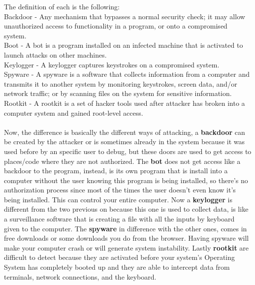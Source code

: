 \documentclass[12pt]{article}
\begin{document}
\begin{enumerate}
	The definition of each is the following: \\
	Backdoor - Any mechanism that bypasses a normal security check; it may allow unauthorized access to functionality in a program, or onto a compromised system. \\
	Boot - A bot is a program installed on an infected machine that is activated to launch attacks on other machines.\\ 
	Keylogger - A keylogger captures keystrokes on a compromised system.\\
	Spyware - A spyware is a software that collects information from a computer and transmits it to another system by monitoring keystrokes, screen data, and/or network traffic; or by scanning files on the system for sensitive information.\\
	Rootkit - A rootkit is a set of hacker tools used after attacker has broken into a computer system and gained root-level access.\\ \\ Now, the difference is basically the different ways of attacking, a \textbf{backdoor} can be created by the attacker or is sometimes already in the system because it was used before by an specific user to debug, but these doors are used to get access to places/code where they are not authorized. The \textbf{bot} does not get access like a backdoor to the program, instead, is its own program that is install into a computer without the user knowing this program is being installed, so there's no authorization process since most of the times the user doesn't even know it's being installed. This can control your entire computer. Now a \textbf{keylogger} is different from the two previous on because this one is used to collect data, is like a surveillance software that is creating a file with all the inputs by keyboard given to the computer. The \textbf{spyware} in difference with the other ones, comes in free downloads or some downloads you do from the browser. Having spyware will make your computer crash or will generate system instability. Lastly \textbf{rootkit}  are difficult to detect because they are activated before your system's Operating System has completely booted up and they are able to intercept data from terminals, network connections, and the keyboard.

		
			\vspace{10pt}
	

\end{enumerate}
\end{document}
